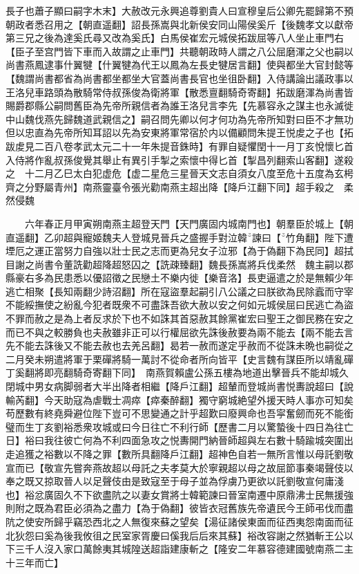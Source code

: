 長子也蕭子顯曰嗣字木末】大赦改元永興追尊劉貴人曰宣穆皇后公卿先罷歸第不預朝政者悉召用之【朝直遥翻】詔長孫嵩與北新侯安同山陽侯奚斤【後魏孝文以獻帝第三兄之後為達奚氏尋又改為奚氏】白馬侯崔宏元城侯拓跋屈等八人坐止車門右【臣子至宫門皆下車而入故謂之止車門】共聽朝政時人謂之八公屈磨渾之父也嗣以尚書燕鳳逮事什翼犍【什翼犍為代王以鳳為左長史犍居言翻】使與都坐大官封懿等【魏謂尚書都省為尚書都坐都坐大官蓋尚書長官也坐徂卧翻】入侍講論出議政事以王洛兒車路頭為散騎常侍叔孫俊為衛將軍【散悉亶翻騎奇寄翻】拓跋磨渾為尚書皆賜爵郡縣公嗣問舊臣為先帝所親信者為誰王洛兒言李先【先慕容永之謀主也永滅徙中山魏伐燕先歸魏道武親信之】嗣召問先卿以何才何功為先帝所知對曰臣不才無功但以忠直為先帝所知耳詔以先為安東將軍常宿於内以備顧問朱提王悦䖍之子也【拓跋䖍見二百八卷孝武太元二十一年朱提音銖時】有罪自疑懼閏十一月丁亥悅懷匕首入侍將作亂叔孫俊覺其舉止有異引手掣之索懷中得匕首【掣昌列翻索山客翻】遂殺之　十二月乙巳太白犯虚危【虚二星危三星晉天文志自須女八度至危十五度為玄枵齊之分野屬青州】南燕靈臺令張光勸南燕主超出降【降戶江翻下同】超手殺之　柔然侵魏

　　六年春正月甲寅朔南燕主超登天門【天門廣固内城南門也】朝羣臣於城上【朝直遥翻】乙卯超與寵姬魏夫人登城見晉兵之盛握手對泣韓諫曰【竹角翻】陛下遭堙厄之運正當努力自強以壯士民之志而更為兒女子泣邪【為于偽翻下為民同】超拭目謝之尚書令董詵勸超降超怒囚之【詵疎臻翻】魏長孫嵩將兵伐柔然　魏主嗣以郡縣豪右多為民患悉以優詔徵之民戀土不樂内徙【樂音洛】長吏逼遣之於是無賴少年逃亡相聚【長知兩翻少詩沼翻】所在寇盜羣起嗣引八公議之曰朕欲為民除蠧而守宰不能綏撫使之紛亂今犯者既衆不可盡誅吾欲大赦以安之何如元城侯屈曰民逃亡為盜不罪而赦之是為上者反求於下也不如誅其首惡赦其餘黨崔宏曰聖王之御民務在安之而已不與之較勝負也夫赦雖非正可以行權屈欲先誅後赦要為兩不能去【兩不能去言先不能去誅後又不能去赦也去羌呂翻】曷若一赦而遂定乎赦而不從誅未晩也嗣從之二月癸未朔遣將軍于栗磾將騎一萬討不從命者所向皆平【史言魏有謀臣所以靖亂磾丁奚翻將即亮翻騎奇寄翻下同】　南燕賀賴盧公孫五樓為地道出擊晉兵不能却城久閉城中男女病脚弱者大半出降者相繼【降戶江翻】超輦而登城尚書悦夀說超曰【說輸芮翻】今天助寇為虐戰士凋瘁【瘁秦醉翻】獨守窮城絶望外援天時人事亦可知矣苟歷數有終堯舜避位陛下豈可不思變通之計乎超歎曰廢興命也吾寜奮劒而死不能銜璧而生丁亥劉裕悉衆攻城或曰今日往亡不利行師【歷書二月以驚蟄後十四日為往亡日】裕曰我往彼亡何為不利四面急攻之悦夀開門納晉師超與左右數十騎踰城突圍出走追獲之裕數以不降之罪【數所具翻降戶江翻】超神色自若一無所言惟以母託劉敬宣而已【敬宣先嘗奔燕故超以母託之夫孝莫大於寧親超以母之故屈節事秦竭聲伎以奉之既又掠取晉人以足聲伎由是致寇至于母子並為俘虜乃更欲以託劉敬宣何庸淺也】裕忿廣固久不下欲盡阬之以妻女賞將士韓範諫曰晉室南遷中原鼎沸士民無援強則附之既為君臣必須為之盡力【為于偽翻】彼皆衣冠舊族先帝遺民今王師弔伐而盡阬之使安所歸乎竊恐西北之人無復來蘇之望矣【湯征諸侯東面而征西夷怨南面而征北狄怨曰奚為後我攸徂之民室家胥慶曰傒我后后來其蘇】裕改容謝之然猶斬王公以下三千人沒入家口萬餘夷其城隍送超詣建康斬之【隆安二年慕容德建國號南燕二主十三年而亡】

